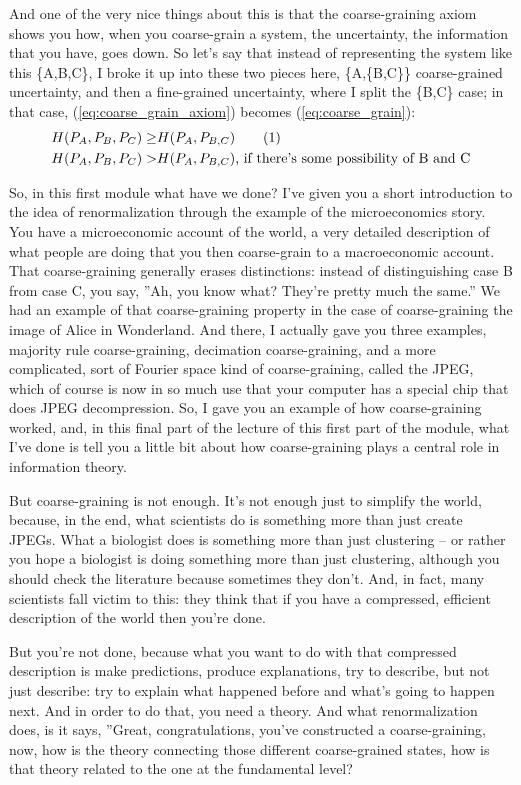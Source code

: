 \documentclass[]{article}
\newcommand\numberthis{\addtocounter{equation}{1}\tag{\theequation}}
\begin{document}
And one of the very nice things about this
is that the coarse-graining axiom shows you how,
when you coarse-grain a system, the uncertainty,
the information that you have, goes down.
So let's say that instead of representing
the system like this \{A,B,C\},
I broke it up into these two pieces here, \{A,\{B,C\}\}
coarse-grained uncertainty,
and then a fine-grained uncertainty,
where I split the \{B,C\} case;
in that case, (\ref{eq:coarse_grain_axiom})  becomes (\ref{eq:coarse_grain}):
\begin{align*}
H (P_A,P_B,P_C) \ge& H(P_A,P_{B,C})  \numberthis \label{eq:coarse_grain}\\
H (P_A,P_B,P_C) >& H(P_A,P_{B,C})\text{, if there's some possibility of B and C}
\end{align*}

So, in this first module what have we done? I've given you a short introduction
to the idea of renormalization through the example of the microeconomics story. You have a microeconomic account of the world,
a very detailed description of what people are doing
that you then coarse-grain to a macroeconomic account.
That coarse-graining generally erases distinctions:
instead of distinguishing case B from case C,
you say, ''Ah, you know what? They're pretty much the same.''
We had an example of that coarse-graining property
in the case of coarse-graining the image of Alice in Wonderland.
And there, I actually gave you three examples,
majority rule coarse-graining, decimation coarse-graining,
and a more complicated, sort of Fourier space kind of coarse-graining,
called the JPEG, which of course is now in so much use
that your computer has a special chip that does JPEG decompression.
So, I gave you an example of how coarse-graining worked,
and, in this final part of the lecture of this first part of the module,
what I've done is tell you a little bit about
how coarse-graining plays a central role in information theory.

But coarse-graining is not enough. It's not enough
just to simplify the world, because, in the end, what scientists do
is something more than just create JPEGs. What a biologist does
is something more than just clustering – or rather you hope a biologist is doing
something more than just clustering, although you should check the literature
because sometimes they don't. And, in fact, many scientists
fall victim to this: they think that if you have a compressed,
efficient description of the world then you're done.

But you're not done, because what you want to do
with that compressed description is make predictions, produce explanations,
try to describe, but not just describe: try to explain what happened before
and what's going to happen next. And in order to do that,
you need a theory. And what renormalization does,
is it says, ''Great, congratulations, you've constructed a coarse-graining,
now, how is the theory connecting those different coarse-grained states,
how is that theory related to the one at the fundamental level?
\end{document}

